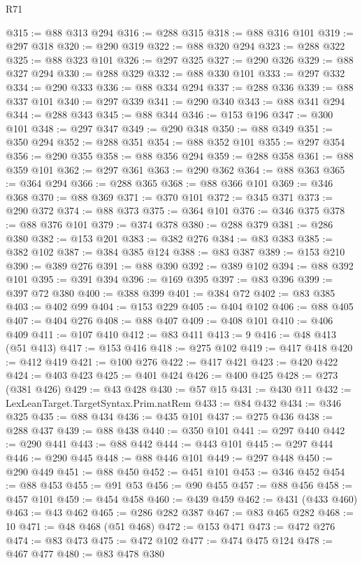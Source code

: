 \begin{lexlean}{R71}
\begin{coremodule}
@315 := @88 @313 @294
@316 := @288 @315
@318 := @88 @316 @101
@319 := @297 @318
@320 := @290 @319
@322 := @88 @320 @294
@323 := @288 @322
@325 := @88 @323 @101
@326 := @297 @325
@327 := @290 @326
@329 := @88 @327 @294
@330 := @288 @329
@332 := @88 @330 @101
@333 := @297 @332
@334 := @290 @333
@336 := @88 @334 @294
@337 := @288 @336
@339 := @88 @337 @101
@340 := @297 @339
@341 := @290 @340
@343 := @88 @341 @294
@344 := @288 @343
@345 := @88 @344
@346 := @153 @196
@347 := @300 @101
@348 := @297 @347
@349 := @290 @348
@350 := @88 @349
@351 := @350 @294
@352 := @288 @351
@354 := @88 @352 @101
@355 := @297 @354
@356 := @290 @355
@358 := @88 @356 @294
@359 := @288 @358
@361 := @88 @359 @101
@362 := @297 @361
@363 := @290 @362
@364 := @88 @363
@365 := @364 @294
@366 := @288 @365
@368 := @88 @366 @101
@369 := @346 @368
@370 := @88 @369
@371 := @370 @101
@372 := @345 @371
@373 := @290 @372
@374 := @88 @373
@375 := @364 @101
@376 := @346 @375
@378 := @88 @376 @101
@379 := @374 @378
@380 := @288 @379
@381 := @286 @380
@382 := @153 @201
@383 := @382 @276
@384 := @83 @383
@385 := @382 @102
@387 := @384 @385 @124
@388 := @83 @387
@389 := @153 @210
@390 := @389 @276
@391 := @88 @390
@392 := @389 @102
@394 := @88 @392 @101
@395 := @391 @394
@396 := @169 @395
@397 := @83 @396
@399 := @397 @72 @380
@400 := @388 @399
@401 := @384 @72
@402 := @83 @385
@403 := @402 @99
@404 := @153 @229
@405 := @404 @102
@406 := @88 @405
@407 := @404 @276
@408 := @88 @407
@409 := @408 @101
@410 := @406 @409
@411 := @107 @410
@412 := @83 @411
@413 := 9
@416 := @48 @413 (@51 @413)
@417 := @153 @416
@418 := @275 @102
@419 := @417 @418
@420 := @412 @419
@421 := @100 @276
@422 := @417 @421
@423 := @420 @422
@424 := @403 @423
@425 := @401 @424
@426 := @400 @425
@428 := @273 (@381 @426)
@429 := @43 @428
@430 := @57 @15
@431 := @430 @11
@432 := LexLeanTarget.TargetSyntax.Prim.natRem
@433 := @84 @432
@434 := @346 @325
@435 := @88 @434
@436 := @435 @101
@437 := @275 @436
@438 := @288 @437
@439 := @88 @438
@440 := @350 @101
@441 := @297 @440
@442 := @290 @441
@443 := @88 @442
@444 := @443 @101
@445 := @297 @444
@446 := @290 @445
@448 := @88 @446 @101
@449 := @297 @448
@450 := @290 @449
@451 := @88 @450
@452 := @451 @101
@453 := @346 @452
@454 := @88 @453
@455 := @91 @53
@456 := @90 @455
@457 := @88 @456
@458 := @457 @101
@459 := @454 @458
@460 := @439 @459
@462 := @431 (@433 @460)
@463 := @43 @462
@465 := @286 @282 @387
@467 := @83 @465 @282
@468 := 10
@471 := @48 @468 (@51 @468)
@472 := @153 @471
@473 := @472 @276
@474 := @83 @473
@475 := @472 @102
@477 := @474 @475 @124
@478 := @467 @477
@480 := @83 @478 @380

\end{coremodule}
\end{lexlean}
